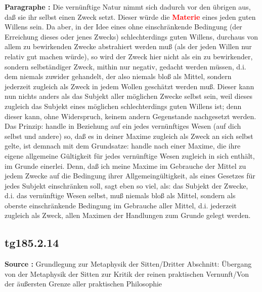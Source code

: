 \documentclass[a4paper,12pt,twoside]{book}
\newcommand{\match}[1]{\textcolor{red}{\textbf{#1}}}
\begin{document}
	\noindent\textbf{Paragraphe : }Die vernünftige Natur nimmt sich dadurch vor den übrigen aus, daß sie ihr selbst einen Zweck setzt. Dieser würde die \match{Materie} eines jeden guten Willens sein. Da aber, in der Idee eines ohne einschränkende Bedingung (der Erreichung dieses oder jenes Zwecks) schlechterdings guten Willens, durchaus von allem zu bewirkenden Zwecke abstrahiert werden muß (als der jeden Willen nur relativ gut machen würde), so wird der Zweck hier nicht als ein zu bewirkender, sondern selbständiger Zweck, mithin nur negativ, gedacht werden müssen, d.i. dem niemals zuwider gehandelt, der also niemals bloß als Mittel, sondern jederzeit zugleich als Zweck in jedem Wollen geschätzt werden muß. Dieser kann nun nichts anders als das Subjekt aller möglichen Zwecke selbst sein, weil dieses zugleich das Subjekt eines möglichen schlechterdings guten Willens ist; denn dieser kann, ohne Widerspruch, keinem andern Gegenstande nachgesetzt werden. Das Prinzip: handle in Beziehung auf ein jedes vernünftiges Wesen (auf dich selbst und andere) so, daß es in deiner Maxime zugleich als Zweck an sich selbst gelte, ist demnach mit dem Grundsatze: handle nach einer Maxime, die ihre eigene allgemeine Gültigkeit für jedes vernünftige Wesen zugleich in sich enthält, im Grunde einerlei. Denn, daß ich meine Maxime im Gebrauche der Mittel zu jedem Zwecke auf die Bedingung ihrer Allgemeingültigkeit, als eines Gesetzes für jedes Subjekt einschränken soll, sagt eben so viel, als: das Subjekt der Zwecke, d.i. das vernünftige  Wesen selbst, muß niemals bloß als Mittel, sondern als oberste einschränkende Bedingung im Gebrauche aller Mittel, d.i. jederzeit zugleich als Zweck, allen Maximen der Handlungen zum Grunde gelegt werden. 
	
	\subsection*{tg185.2.14} 
	\textbf{Source : }Grundlegung zur Metaphysik der Sitten/Dritter Abschnitt: Übergang von der Metaphysik der Sitten zur Kritik der reinen praktischen Vernunft/Von der äußersten Grenze aller praktischen Philosophie\\  
	
\end{document}
